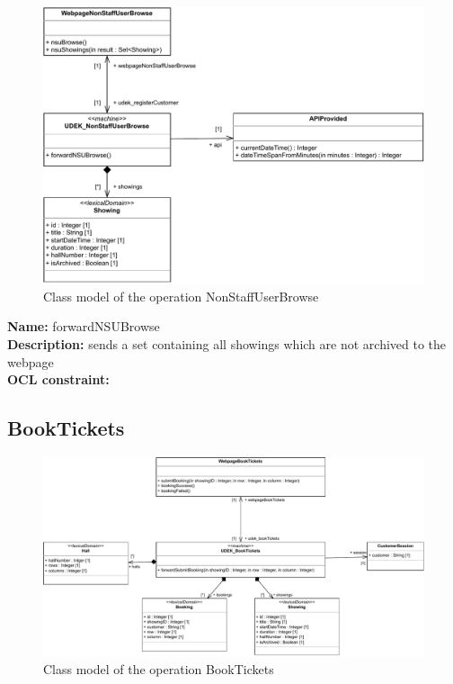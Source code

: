 \documentclass[a4paper,10pt,titlepage,bibtotoc,bibtotocnumbered]{scrreprt}
\begin{document}
\begin{figure}[H]
    \centering
    \includegraphics[width = \textwidth]{figures/06/a06_class_diagram_NonStaffUserBrowse.pdf}
    \caption{Class model of the operation NonStaffUserBrowse}
    \label{figure:operation_NonStaffUserBrowse_class_diagram}
\end{figure}

\textbf{Name:} forwardNSUBrowse
\\
\textbf{Description:} sends a set containing all showings which are not archived to the webpage
\\
\textbf{OCL constraint:}


\subsection{BookTickets}

\begin{figure}[H]
    \centering
    \includegraphics[width = \textwidth]{figures/07/a07_class_diagram_BookTickets.pdf}
    \caption{Class model of the operation BookTickets}
    \label{figure:operation_BookTickets_class_diagram}
\end{figure}
\end{document}
